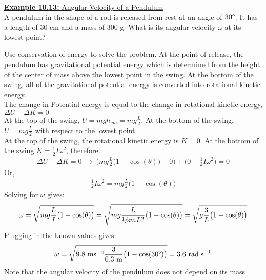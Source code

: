 \documentclass[a4paper]{article}
\let\bf\textbf
\newcommand\rads{\text{ rad\;s}^{-1}}
\newcommand\m{\text{ m}}
\newcommand\mss{\text{ ms}^{-2}}
\def\centerarc[#1](#2)(#3:#4:#5){\draw[#1] ($(#2)+({#5*cos(#3)},{#5*sin(#3)})$) arc (#3:#4:#5)}
\begin{document}
\newpage
\begin{shaded}
    \underline{\bf{Example 10.13:} Angular Velocity of a Pendulum}
    \vspace{2mm}\\
    A pendulum in the shape of a rod is released from rest at an angle of $30\degree$. It has a length of 30 cm and a mass of 300 g. What is its angular velocity $\omega$ at its lowest point?
    \begin{center}
    \end{center}
    Use conservation of energy to solve the problem. At the point of release, the pendulum has gravitational potential energy which is determined from the height of the center of mass above the lowest point in the swing. At the bottom of the swing, all of the gravitational potential energy is converted into rotational kinetic energy.
    \vspace{1mm}\\
    The change in Potential energy is equal to the change in rotational kinetic energy, $\Delta U + \Delta K = 0$\\
    At the top of the swing, $\displaystyle U = mgh_{cm} = mg\frac{L}{2}$. At the bottom of the swing, $\displaystyle U = mg\frac{L}{2}$ with respect to the lowest point\\
    At the top of the swing, the rotational kinetic energy is $K = 0$. At the bottom of the swing $K = \frac{1}{2}I\omega^2$, therefore:
    \begin{align*}
        \Delta U + \Delta K = 0\ \boldsymbol{\to}\ \Big(mg\frac{L}{2}\big(1 - \cos(\theta)\big) - 0\Big) + \Big(0 - \frac{1}{2}I\omega^2\Big) = 0
    \end{align*}
    Or,
    \begin{align*}
        \frac{1}{2}I\omega^2 = mg\frac{L}{2}\big(1 - \cos(\theta)\big)
    \end{align*}
    Solving for $\omega$ gives:
    \begin{align*}
        \omega = \sqrt{mg\frac{L}{I}\big(1 - \cos(\theta)\big)} =\sqrt{mg\frac{L}{\sfrac{1}{3}mL^2}\big(1 - \cos(\theta)\big)} = \sqrt{g\frac{3}{L}\big(1 - \cos(\theta)\big)}
    \end{align*}
    Plugging in the known values gives:
    \begin{align*}
        \omega = \sqrt{9.8\mss\frac{3}{0.3\m}\big(1 - \cos(30\degree)\big)} = 3.6\rads
    \end{align*}
    Note that the angular velocity of the pendulum does not depend on its mass
\end{shaded}
\newpage
\end{document}
